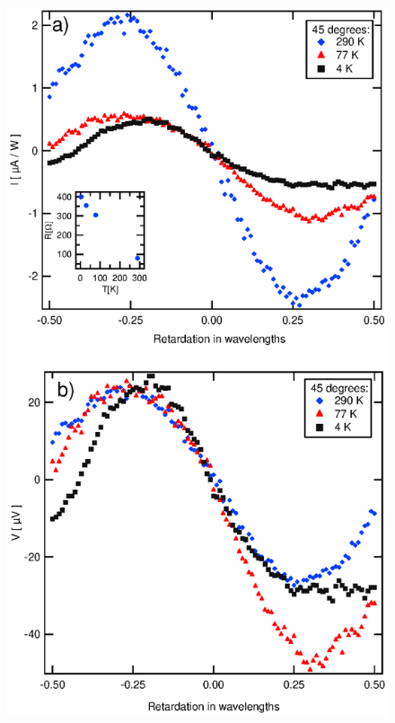 \documentclass{article}
\begin{document}
\begin{figure}[htb]
\begin{center}
\includegraphics[scale=0.75]{fig5.eps}
\end{center}
\end{figure}
\end{document}
